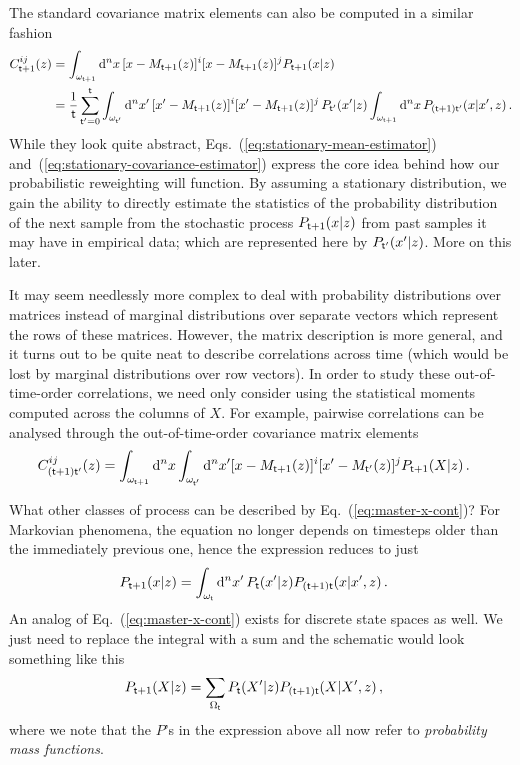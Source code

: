 The standard covariance matrix elements can also be computed in a similar fashion
\begin{align}
C^{ij}_{{\sf t}+1}(z) &= \int_{\omega_{{\sf t}+1}}{\rm d}^nx \,[x-M_{{\sf t}+1}(z)
]^i[x-M_{{\sf t}+1}(z)]^jP_{{\sf t}+1}(x\vert z) \nonumber \\
&= \frac{1}{{\sf t}}\sum_{{\sf t}'=0}^{{\sf t}}\int_{\omega_{{\sf t}'}}{\rm d}^nx' \, [x'-M_{{\sf t}+1}(z)]^i[x'-M_{{\sf t}+1}(z)]^j \,P_{{\sf t}'}(x'\vert z) \int_{\omega_{{\sf t}+1}}{\rm d}^nx \, P_{({\sf t}+1){\sf t}'}(x\vert x',z) \label{eq:stationary-covariance-estimator}\,.
\end{align}
While they look quite abstract, Eqs.~(\ref{eq:stationary-mean-estimator}) and~(\ref{eq:stationary-covariance-estimator}) express the core idea behind how our probabilistic reweighting will function. By assuming a stationary distribution, we gain the ability to directly estimate the statistics of the probability distribution of the next sample from the stochastic process $P_{{\sf t}+1}(x\vert z)$ from past samples it may have in empirical data; which are represented here by $P_{{\sf t}'}(x'\vert z)$. More on this later.

It may seem needlessly more complex to deal with probability distributions over matrices instead of marginal distributions over separate vectors which represent the rows of these matrices. However, the matrix description is more general, and it turns out to be quite neat to describe correlations across time (which would be lost by marginal distributions over row vectors). In order to study these out-of-time-order correlations, we need only consider using the statistical moments computed across the columns of $X$. For example, pairwise correlations can be analysed through the out-of-time-order covariance matrix elements
\begin{align}
C_{({\sf t}+1){\sf t}'}^{ij}(z) &= \int_{\omega_{{\sf t}+1}}{\rm d}^nx\int_{\omega_{{\sf t}'}}{\rm d}^nx' [x-M_{{\sf t}+1}(z)
]^i[x'-M_{{\sf t}'}(z)]^jP_{{\sf t}+1}(X\vert z) \label{eq:out-of-time-order-covariance-estimator} \,.
\end{align}

What other classes of process can be described by Eq.~(\ref{eq:master-x-cont})? For Markovian phenomena, the equation no longer depends on timesteps older than the immediately previous one, hence the expression reduces to just
\begin{align}
P_{{\sf t}+1}(x\vert z) &= \int_{\omega_{\sf t}}{\rm d}^nx' \, P_{\sf t}(x'\vert z) P_{({\sf t}+1){\sf t}}(x\vert x',z) \label{eq:master-x-cont-markov} \,.
\end{align}
An analog of Eq.~(\ref{eq:master-x-cont}) exists for discrete state spaces as well. We just need to replace the integral with a sum and the schematic would look something like this
\begin{align}
P_{{\sf t}+1}(X\vert z) &= \sum_{\Omega_{{\sf t}}} P_{{\sf t}}(X'\vert z) P_{({\sf t}+1){\sf t}}(X \vert X', z) \label{eq:master-x-disc} \,,
\end{align}
where we note that the $P$'s in the expression above all now refer to \emph{probability mass functions}.

